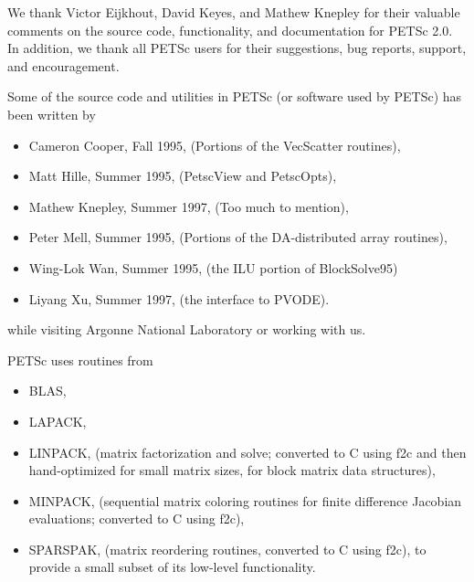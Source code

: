 

\medskip \medskip 
We thank Victor Eijkhout, David Keyes, and Mathew Knepley for their valuable comments on the 
source code, functionality, and documentation  for PETSc 2.0.  
In addition, we thank all PETSc users for
their suggestions, bug reports, support, and encouragement.

\vspace{.3in}
Some of the source code and utilities in PETSc (or software used by PETSc)
has been written by 
\begin{itemize}
  \item Cameron Cooper, Fall 1995, (Portions of the VecScatter routines), 
  \item Matt Hille, Summer 1995, (PetscView and PetscOpts), 
  \item Mathew Knepley, Summer 1997, (Too much to mention),
  \item Peter Mell, Summer 1995, (Portions of the DA-distributed array routines),
  \item Wing-Lok Wan, Summer 1995, (the ILU portion of BlockSolve95)
  \item Liyang Xu, Summer 1997, (the interface to PVODE).
\end{itemize}
while visiting Argonne National Laboratory or working with us.

\vspace{.3in}
PETSc uses routines from 
\begin{itemize}
  \item BLAS, 
  \item LAPACK,
  \item LINPACK,      (matrix factorization and solve; converted to C using f2c and then 
                      hand-optimized for small matrix sizes, for block matrix data structures),
  \item MINPACK,      (sequential matrix coloring routines for finite difference Jacobian
                       evaluations; converted to C using f2c),
  \item SPARSPAK,     (matrix reordering routines, converted to C using f2c),
to provide a small subset of its low-level functionality.
\end{itemize}

